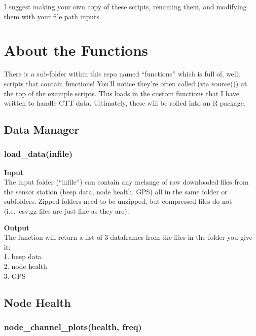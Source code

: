 \documentclass[
]{book}
\begin{document}
I suggest making your own copy of these scripts, renaming them, and modifying them with your file path inputs.

\hypertarget{about-the-functions}{%
\chapter{About the Functions}\label{about-the-functions}}

There is a sub-folder within this repo named ``functions'' which is full of, well, scripts that contain functions! You'll notice they're often called (via source()) at the top of the example scripts. This loads in the custom functions that I have written to handle CTT data. Ultimately, these will be rolled into an R package.

\hypertarget{data-manager}{%
\section{Data Manager}\label{data-manager}}

\hypertarget{load_datainfile}{%
\subsection{load\_data(infile)}\label{load_datainfile}}

\textbf{Input}\\
The input folder (``infile'') can contain any melange of raw downloaded files from the sensor station (beep data, node health, GPS) all in the same folder or subfolders. Zipped folders need to be unzipped, but compressed files do not (i.e.~csv.gz files are just fine as they are).

\textbf{Output}\\
The function will return a list of 3 dataframes from the files in the folder you give it:\\
1. beep data\\
2. node health\\
3. GPS

\hypertarget{node-health}{%
\section{Node Health}\label{node-health}}

\hypertarget{node_channel_plotshealth-freq}{%
\subsection{node\_channel\_plots(health, freq)}\label{node_channel_plotshealth-freq}}
\end{document}
